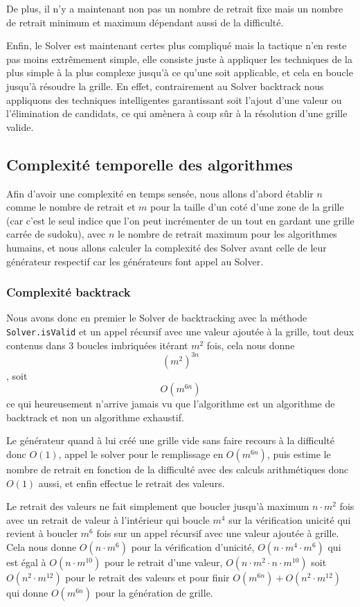 \documentclass[a4paper]{article}
\begin{document}
De plus, il n'y a maintenant non pas un nombre de retrait fixe mais un nombre de retrait minimum et maximum dépendant aussi de la difficulté.

Enfin, le Solver est maintenant certes plus compliqué mais la tactique n'en reste pas moins extrêmement simple, elle consiste juste à appliquer les techniques de la plus simple à la plus complexe jusqu'à ce qu'une soit applicable, et cela en boucle jusqu'à résoudre la grille. En effet, contrairement au Solver backtrack nous appliquons des techniques intelligentes garantissant soit l'ajout d'une valeur ou l'élimination de candidats, ce qui amènera à coup sûr à la résolution d'une grille valide.

\subsection{Complexité temporelle des algorithmes}
Afin d'avoir une complexité en temps sensée, nous allons d'abord établir $n$ comme le nombre de retrait et $m$ pour la taille d'un coté d'une zone de la grille (car c'est le seul indice que l'on peut incrémenter de un tout en gardant une grille carrée de sudoku), avec $n$ le nombre de retrait maximum pour les algorithmes humains, et nous allons calculer la complexité des Solver avant celle de leur générateur respectif car les générateurs font appel au Solver.

\subsubsection{Complexité backtrack}
Nous avons donc en premier le Solver de backtracking avec la méthode \texttt{Solver.isValid} et un appel récursif avec une valeur ajoutée à la grille, tout deux contenus dans 3 boucles imbriquées itérant $m^2$ fois, cela nous donne \[(m^2)^{3n}\], soit \[O(m^{6n})\] ce qui heureusement n'arrive jamais vu que l'algorithme est un algorithme de backtrack et non un algorithme exhaustif.

Le générateur quand à lui créé une grille vide sans faire recours à la difficulté donc $O(1)$, appel le solver pour le remplissage en $O(m^{6n})$, puis estime le nombre de retrait en fonction de la difficulté avec des calculs arithmétiques donc $O(1)$ aussi, et enfin effectue le retrait des valeurs. 

Le retrait des valeurs ne fait simplement que boucler jusqu'à maximum $n \cdot m^2$ fois avec un retrait de valeur à l'intérieur qui boucle $m^4$ sur la vérification unicité qui revient à boucler $m^6$ fois sur un appel récursif avec une valeur ajoutée à grille. Cela nous donne $O(n \cdot m^6)$ pour la vérification d'unicité, $O(n \cdot m^4 \cdot m^6)$ qui est égal à $O(n \cdot m^{10})$ pour le retrait d'une valeur, $O(n \cdot m^2 \cdot n \cdot m^{10})$ soit $O(n^2 \cdot m^{12})$ pour le retrait des valeurs et pour finir $O(m^{6n}) + O(n^2 \cdot m^{12})$ qui donne $O(m^{6n})$ pour la génération de grille.
\end{document}
